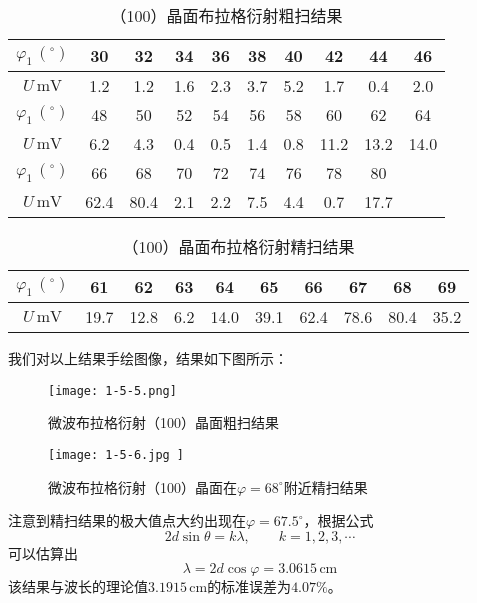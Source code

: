 \documentclass[12pt]{article}
\begin{document}
\begin{table}[h!]
    \centering
    \begin{tabular}{|c|c|c|c|c|c|c|c|c|c|}
    \hline
    $\varphi_1\,(^\circ)$ & 30   & 32   & 34  & 36  & 38  & 40  & 42   & 44   & 46   \\ \hline
    $U\,\mathrm{mV}$   & 1.2  & 1.2  & 1.6 & 2.3 & 3.7 & 5.2 & 1.7  & 0.4  & 2.0  \\ \hline
    $\varphi_1\,(^\circ)$ & 48   & 50   & 52  & 54  & 56  & 58  & 60   & 62   & 64   \\ \hline
    $U\,\mathrm{mV}$   & 6.2  & 4.3  & 0.4 & 0.5 & 1.4 & 0.8 & 11.2 & 13.2 & 14.0 \\ \hline
    $\varphi_1\,(^\circ)$ & 66   & 68   & 70  & 72  & 74  & 76  & 78   & 80   &      \\ \hline
    $U\,\mathrm{mV}$   & 62.4 & 80.4 & 2.1 & 2.2 & 7.5 & 4.4 & 0.7  & 17.7 &      \\ \hline
    \end{tabular}
    \caption{（100）晶面布拉格衍射粗扫结果}
\end{table}

\begin{table}[h!]
    \centering
    \begin{tabular}{|c|c|c|c|c|c|c|c|c|c|}
        \hline
        $\varphi_1\,(^\circ)$ & 61 & 62 & 63 & 64 & 65 & 66 & 67 & 68 & 69 \\
        \hline
        $U\,\mathrm{mV}$ & 19.7 & 12.8 & 6.2 & 14.0 & 39.1 & 62.4 & 78.6 & 80.4 & 35.2 \\
        \hline
    \end{tabular}
    \caption{（100）晶面布拉格衍射精扫结果}
\end{table}

我们对以上结果手绘图像，结果如下图所示：

\begin{figure}[h!]
    \centering
    \texttt{[image: 1-5-5.png]}
    \caption{微波布拉格衍射（100）晶面粗扫结果}
\end{figure}

\begin{figure}[h!]
    \centering
    \texttt{[image: 1-5-6.jpg
    ]}
    \caption{微波布拉格衍射（100）晶面在$\varphi=68^\circ$附近精扫结果}
\end{figure}

注意到精扫结果的极大值点大约出现在$\varphi=67.5^\circ$，根据公式
\[
    2d\sin\theta=k\lambda,\qquad k=1,2,3,\cdots
\]
可以估算出
\[
    \lambda=2d\cos\varphi=3.0615\,\mathrm{cm}
\]
该结果与波长的理论值$3.1915\,\mathrm{cm}$的标准误差为$4.07\%$。
\end{document}
